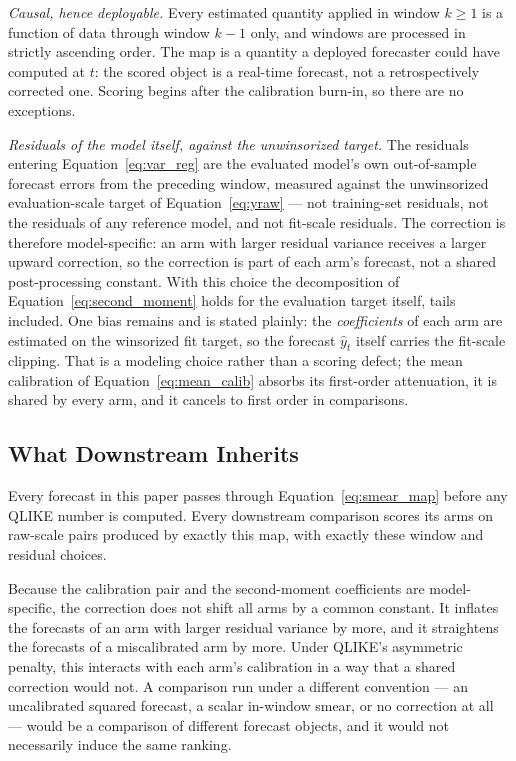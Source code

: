 \emph{Causal, hence deployable.} Every estimated quantity applied in
window $k \ge 1$ is a function of data through window $k-1$ only, and
windows are processed in strictly ascending order. The map is a quantity a
deployed forecaster could have computed at $t$: the scored object is a
real-time forecast, not a retrospectively corrected one. Scoring begins
after the calibration burn-in, so there are no exceptions.

\emph{Residuals of the model itself, against the unwinsorized target.} The
residuals entering Equation~\eqref{eq:var_reg} are the evaluated model's
own out-of-sample forecast errors from the preceding window, measured
against the unwinsorized evaluation-scale target of
Equation~\eqref{eq:yraw} --- not training-set residuals, not the residuals
of any reference model, and not fit-scale residuals. The correction is
therefore model-specific: an arm with larger residual variance receives a
larger upward correction, so the correction is part of each arm's
forecast, not a shared post-processing constant. With this choice the
decomposition of Equation~\eqref{eq:second_moment} holds for the
evaluation target itself, tails included. One bias remains and is stated
plainly: the \emph{coefficients} of each arm are estimated on the
winsorized fit target, so the forecast $\hat{y}_t$ itself carries the
fit-scale clipping. That is a modeling choice rather than a scoring
defect; the mean calibration of Equation~\eqref{eq:mean_calib} absorbs its
first-order attenuation, it is shared by every arm, and it cancels to
first order in comparisons.

\subsection{What Downstream Inherits}
\label{sec:smearing_contract}

Every forecast in this paper passes through Equation~\eqref{eq:smear_map}
before any QLIKE number is computed. Every downstream comparison
 scores its arms on raw-scale pairs produced by exactly this map,
with exactly these window and residual choices.

Because the calibration pair and the second-moment coefficients are
model-specific, the correction does not shift all arms by a common
constant. It inflates the forecasts of an arm with larger residual
variance by more, and it straightens the forecasts of a miscalibrated arm
by more. Under QLIKE's asymmetric penalty, this interacts with each arm's
calibration in a way that a shared correction would not. A comparison run
under a different convention --- an uncalibrated squared forecast, a
scalar in-window smear, or no correction at all --- would be a comparison
of different forecast objects, and it would not necessarily induce the
same ranking.

